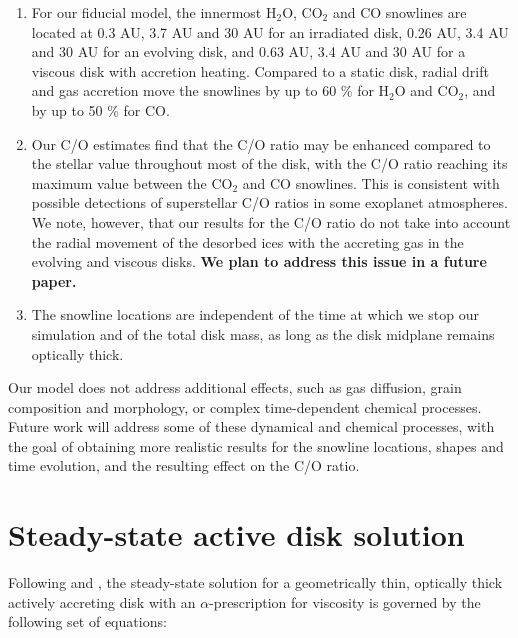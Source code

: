 \documentclass[apj]{emulateapj}
\begin{document}
\begin{enumerate}
\item For our fiducial model, the innermost H$_2$O, CO$_2$ and CO snowlines are located at 0.3 AU, 3.7 AU and 30 AU for an irradiated disk, 0.26 AU, 3.4 AU and 30 AU for an evolving disk, and 0.63 AU, 3.4 AU and 30 AU for a viscous disk with accretion heating. Compared to a static disk, radial drift and gas accretion move the snowlines by up to 60 \% for H$_2$O and CO$_2$, and by up to 50 \% for CO. 

\item Our C/O estimates find that the C/O ratio may be enhanced compared to the stellar value throughout most of the disk, with the C/O ratio reaching its maximum value between the CO$_2$ and CO snowlines. This is consistent with possible detections of superstellar C/O ratios in some exoplanet atmospheres. We note, however, that our results for the C/O ratio do not take into account the radial movement of the desorbed ices with the accreting gas in the evolving and viscous disks. \textbf{We plan to address this issue in a future paper.}

\item The snowline locations are independent of the time at which we stop our simulation and of the total disk mass, as long as the disk midplane remains optically thick. %

\end{enumerate}

Our model does not address additional effects, such as gas diffusion, grain composition and morphology, or complex time-dependent chemical processes. Future work will address some of these dynamical and chemical processes, with the goal of obtaining more realistic results for the snowline locations, shapes and time evolution, and the resulting effect on the C/O ratio. %

\appendix
\section{Steady-state active disk solution} \label{app:steadystate}

Following \citet{shakura73} and \citet{armitage10}, the steady-state solution for a geometrically thin, optically thick actively accreting disk with an $\alpha$-prescription for viscosity is governed by the following set of equations:
\end{document}

